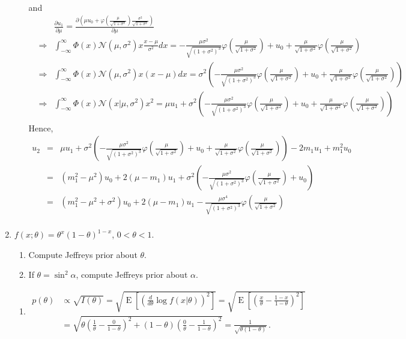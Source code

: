 \documentclass[10pt,a4paper]{article}
\def\MN{{\mathcal N}}
\begin{document}
\begin{enumerate}
\begin{enumerate}
\begin{eqnarray*}
\end{eqnarray*}
and 
\begin{eqnarray*}
&& \frac{\partial u_1}{\partial \mu} = \frac{\partial(\mu u_0+ \varphi(\frac{\mu}{\sqrt{1+\sigma^2}})\frac{\sigma^2}{\sqrt{1+\sigma^2}})}{\partial \mu} \\
&\Longrightarrow &\int_{-\infty}^{\infty}\Phi(x)\MN(\mu,\sigma^2)x\frac{x-\mu}{\sigma^2}dx = -\frac{\mu\sigma^2}{\sqrt{(1+\sigma^2)^{3}}}\varphi(\frac{\mu}{\sqrt{1+\sigma^2}})+u_0+\frac{\mu}{\sqrt{1+\sigma^2}}\varphi(\frac{\mu}{\sqrt{1+\sigma^2}}) \\
&\Longrightarrow &\int_{-\infty}^{\infty}\Phi(x)\MN(\mu,\sigma^2)x(x-\mu)dx = \sigma^2\left(-\frac{\mu\sigma^2}{\sqrt{(1+\sigma^2)^{3}}}\varphi(\frac{\mu}{\sqrt{1+\sigma^2}})+u_0+\frac{\mu}{\sqrt{1+\sigma^2}}\varphi(\frac{\mu}{\sqrt{1+\sigma^2}})\right) \\
&\Longrightarrow &\int_{-\infty}^{\infty} \Phi(x) \MN(x|\mu, \sigma^2)x^2 = \mu u_1+ \sigma^2\left(-\frac{\mu\sigma^2}{\sqrt{(1+\sigma^2)^{3}}}\varphi(\frac{\mu}{\sqrt{1+\sigma^2}})+u_0+\frac{\mu}{\sqrt{1+\sigma^2}}\varphi(\frac{\mu}{\sqrt{1+\sigma^2}})\right) \\
\end{eqnarray*}
Hence,
\begin{eqnarray*}
u_2 &=& \mu u_1+ \sigma^2\left(-\frac{\mu\sigma^2}{\sqrt{(1+\sigma^2)^{3}}}\varphi(\frac{\mu}{\sqrt{1+\sigma^2}})+u_0+\frac{\mu}{\sqrt{1+\sigma^2}}\varphi(\frac{\mu}{\sqrt{1+\sigma^2}})\right)-2m_1u_1+m_1^2u_0 \\
&=& (m_1^2-\mu^2)u_0 +2(\mu-m_1)u_1+\sigma^2\left(-\frac{\mu\sigma^2}{\sqrt{(1+\sigma^2)^{3}}}\varphi(\frac{\mu}{\sqrt{1+\sigma^2}})+u_0\right) \\
&=& (m_1^2-\mu^2+\sigma^2)u_0 +2(\mu-m_1)u_1-\frac{\mu\sigma^4}{\sqrt{(1+\sigma^2)^{3}}}\varphi(\frac{\mu}{\sqrt{1+\sigma^2}}) \\
\end{eqnarray*}
\end{enumerate}
\item $f(x; \theta) = \theta^x(1-\theta)^{1-x}$, $0 < \theta < 1$.
\begin{enumerate}
\item Compute Jeffreys prior about $\theta$.
\item If $\theta = \sin^2 \alpha$, compute Jeffreys prior about $\alpha$.
\end{enumerate}
\begin{enumerate}
\item 
\begin{align*}p(\theta) & \propto \sqrt{I(\theta)} = \sqrt{\operatorname{E}\!\left[ \left( \frac{d}{d\theta} \log f(x|\theta) \right)^2\right]} = \sqrt{\operatorname{E}\!\left[ \left( \frac{x}{\theta} - \frac{1-x}{1-\theta}\right)^2 \right]} \\ & = \sqrt{\theta \left( \frac{1}{\theta} - \frac{0}{1-\theta}\right)^2 + (1-\theta)\left( \frac{0}{\theta} - \frac{1}{1-\theta}\right)^2} = \frac{1}{\sqrt{\theta(1-\theta)}}\,.\end{align*} 

\end{enumerate}
\end{enumerate}
\end{document}
